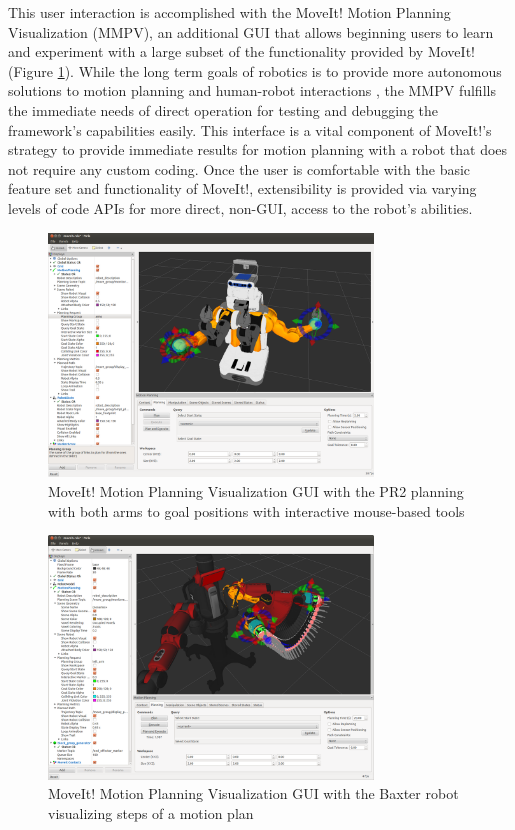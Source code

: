 \documentclass[10pt,journal,compsoc]{joser1}
\begin{document}
{This user interaction is accomplished with the MoveIt! Motion Planning Visualization (MMPV), an additional GUI that allows beginning users to learn and experiment with a large subset of the functionality provided by MoveIt! (Figure \ref{fig:motionrvizplugin}). While the long term goals of robotics is to provide more autonomous solutions to motion planning and human-robot interactions \cite{yancotaxonomy}, the MMPV fulfills the immediate needs of direct operation for testing and debugging the framework's capabilities easily. This interface is a vital component of MoveIt!'s strategy to provide immediate results for motion planning with a robot that does not require any custom coding. Once the user is comfortable with the basic feature set and functionality of MoveIt!, extensibility is provided via varying levels of code APIs for more direct, non-GUI, access to the robot's abilities.

\begin{figure}[!t]
\centering
\includegraphics[width=3.4in]{images/rviz_motion_planning}
\caption{MoveIt! Motion Planning Visualization GUI with the PR2 planning with both arms to goal positions with interactive mouse-based tools}
\label{fig:motionrvizplugin}
\end{figure}

\begin{figure}[!t]
\centering
\includegraphics[width=3.4in]{images/motion_plan}
\caption{MoveIt! Motion Planning Visualization GUI with the Baxter robot visualizing steps of a motion plan}
\label{fig:motion_plan}	
\end{figure}

}
\end{document}
